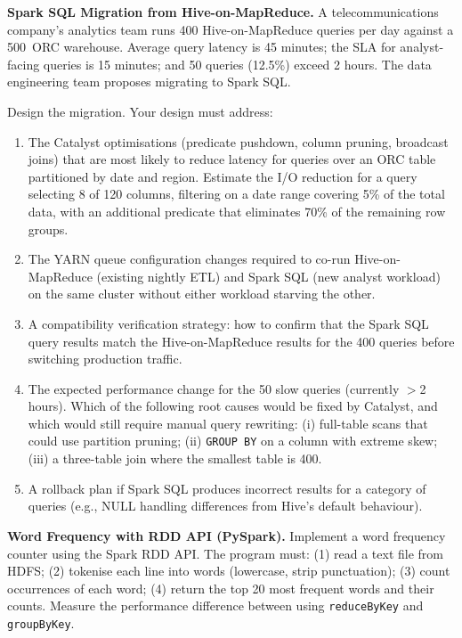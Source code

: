 \dpr \textbf{Spark SQL Migration from Hive-on-MapReduce.}
A telecommunications company's analytics team runs 400 Hive-on-MapReduce
queries per day against a 500\TB\ ORC warehouse. Average query latency
is 45 minutes; the SLA for analyst-facing queries is 15 minutes; and
50 queries (12.5\%) exceed 2 hours. The data engineering team proposes
migrating to Spark SQL.

Design the migration. Your design must address:

\begin{enumerate}[label=(\alph*)]
  \item The Catalyst optimisations (predicate pushdown, column pruning,
        broadcast joins) that are most likely to reduce latency for
        queries over an ORC table partitioned by date and region.
        Estimate the I/O reduction for a query selecting 8 of 120
        columns, filtering on a date range covering 5\% of the total
        data, with an additional predicate that eliminates 70\% of the
        remaining row groups.
  \item The YARN queue configuration changes required to co-run Hive-on-MapReduce
        (existing nightly ETL) and Spark SQL (new analyst workload) on the
        same cluster without either workload starving the other.
  \item A compatibility verification strategy: how to confirm that the
        Spark SQL query results match the Hive-on-MapReduce results for
        the 400 queries before switching production traffic.
  \item The expected performance change for the 50 slow queries (currently
        $>$2 hours). Which of the following root causes would be fixed
        by Catalyst, and which would still require manual query rewriting:
        (i) full-table scans that could use partition pruning;
        (ii) \texttt{GROUP BY} on a column with extreme skew;
        (iii) a three-table join where the smallest table is 400\MB.
  \item A rollback plan if Spark SQL produces incorrect results for
        a category of queries (e.g., NULL handling differences from Hive's
        default behaviour).
\end{enumerate}

\bigskip
{}

\pe \textbf{Word Frequency with RDD API (PySpark).}
Implement a word frequency counter using the Spark RDD API. The program
must: (1) read a text file from HDFS; (2) tokenise each line into words
(lowercase, strip punctuation); (3) count occurrences of each word; (4)
return the top 20 most frequent words and their counts. Measure the
performance difference between using \texttt{reduceByKey} and
\texttt{groupByKey}.

